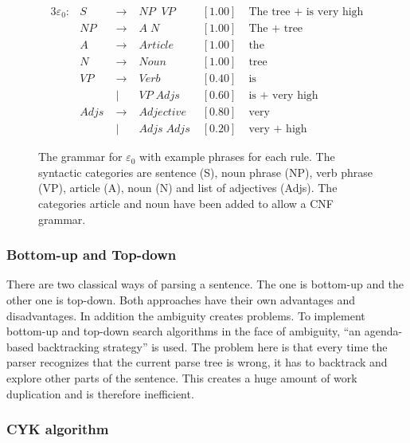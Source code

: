\documentclass[12pt,twoside]{scrartcl}
\theoremstyle{plain}
\theoremstyle{definition}
\theoremstyle{remark}
\begin{document}
		\begin{figure}
			\begin{alignat*}{3}
				\varepsilon_{0}:& S \;&\rightarrow &\; NP\;\;VP \;&[1.00]&\; \text{The tree + is very high} \\
				& NP \;&\rightarrow &\; A\;N \;&[1.00]&\; \text{The + tree}\\
				& A \;&\rightarrow &\; Article\;&[1.00]&\; \text{the}\\
				& N \;&\rightarrow &\; Noun\;&[1.00]&\; \text{tree}\\
				& VP \;&\rightarrow &\; Verb \;&[0.40]&\; \text{is} \\
				& \;&|&\; VP\;Adjs \;&[0.60]&\; \text{is + very high} \\
				& Adjs \;&\rightarrow &\; Adjective \;&[0.80]&\; \text{very} \\
				& \;&|&\; Adjs\;Adjs \;&[0.20]&\; \text{very + high}
			\end{alignat*}
		
			\caption{The grammar for $\varepsilon_{0}$ with example phrases for each rule. The syntactic categories are sentence (S), noun phrase (NP), verb phrase (VP), article (A), noun (N) and list of adjectives (Adjs). The categories article and noun have been added to allow a CNF grammar.}
			\label{fig:grammar}
		\end{figure}
		
		\subsubsection*{Bottom-up and Top-down}
		\label{subSubSec:bottomUpTopDown}
		
		There are two classical ways of parsing a sentence. The one is bottom-up and the other one is top-down. Both approaches have their own advantages and disadvantages. In addition the ambiguity creates problems. To implement bottom-up and top-down search algorithms in the face of ambiguity, ``an agenda-based backtracking strategy''\cite[p.~468]{Jurafsky2009b} is used. The problem here is that every time the parser recognizes that the current parse tree is wrong, it has to backtrack and explore other parts of the sentence. This creates a huge amount of work duplication and is therefore inefficient.
		
		\subsubsection*{CYK algorithm}
		\label{subSubSec:cykAlgorithm}		
		
\end{document}
